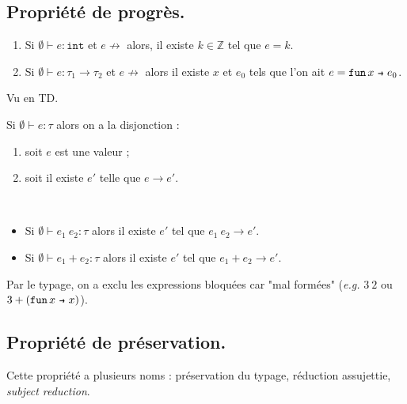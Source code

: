 \documentclass[../main]{subfiles}
\begin{document}
  \subsection{Propriété de progrès.}

  \begin{lem}
    \begin{enumerate}
      \item Si $\emptyset\vdash e: \mathtt{int}$ et $e \not\to$ alors, il existe $k \in \mathds{Z}$ tel que $e = k$.
      \item Si $\emptyset \vdash  e : \tau_1 \to \tau_2$ et $e \not\to$ alors il existe $x$ et $e_0$ tels que l'on ait $e = \fun x e_0$.
    \end{enumerate}
  \end{lem}
  \begin{prv}
    Vu en TD.
  \end{prv}

  \begin{prop}
    Si $\emptyset \vdash e : \tau$ alors on a la disjonction :
    \begin{enumerate}
      \item soit $e$ est une valeur ;
      \item soit il existe $e'$ telle que $e \to e'$.
    \end{enumerate}
  \end{prop}

  \begin{rmk}~
    \begin{itemize}
      \item Si $\emptyset \vdash e_1\ e_2 : \tau$ alors il existe $e'$ tel que $e_1\ e_2 \to e'$.
      \item Si $\emptyset \vdash e_1 + e_2 : \tau$ alors il existe $e'$ tel que $e_1 + e_2 \to e'$.
    \end{itemize}
  \end{rmk}

  \begin{rmk}
    Par le typage, on a exclu les expressions bloquées car "mal formées" (\textit{e.g.} $3\ 2$ ou $3 + (\fun x x)$).
  \end{rmk}

  \subsection{Propriété de préservation.}

  Cette propriété a plusieurs noms : préservation du typage, réduction assujettie, \textit{subject reduction}.
\end{document}
